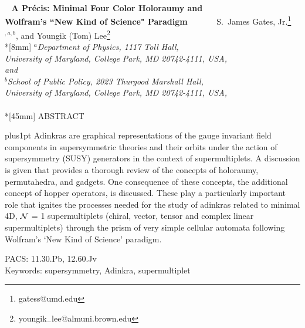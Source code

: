 \documentclass[12pt]{article}
\begin{document}
\thispagestyle{empty}
%
\noindent{\small
\hfill{  \\ %
$~~~~~~~~~~~~~~~~~~~~~~~~~~~~~~~~~~~~~~~~~~~~~~~~~~~~~~~~~~~~~~~~~$
$~~~~~~~~~~~~~~~~~~~~~~~~~~~~~~~~~~~~~~~~~~~~~~~~~~~~~~~~~~~~~~~~~$
{}
}}
\vspace*{0mm}
\begin{center}
{\large \bf
$ ~~$ A  Pr\' ecis: Minimal Four Color 
Holoraumy and  
$~$\\[2pt]
Wolfram's ``New Kind of Science" Paradigm}   \vskip0.3in
{\large {
$~~~~~~~~~~~~~$
S.\ James Gates, Jr.\footnote{gatess@umd.edu}$^{,a,b}$, and 
Youngik (Tom) Lee\footnote{youngik${}_-$lee@almuni.brown.edu}
$~~~~~~$
\newline
}}
\\*[8mm]
\emph{
\centering
$^{a} $Department of Physics, 1117 Toll Hall,
\\[1pt]
University of Maryland, College Park, MD 20742-4111, USA,
\\[4pt] and \\[4pt]
$^{b}$School of Public Policy, 2023
Thurgood Marshall Hall,
\\[1pt]
University of Maryland, College Park, MD 20742-4111, USA,
\\[12pt]
} $~$
 \\*[45mm]
{ ABSTRACT}\\[4mm]
\parbox{142mm}{\parindent=2pc\indent\baselineskip=14pt plus1pt
Adinkras are graphical representations of the gauge invariant field components in supersymmetric theories and their orbits under the action of supersymmetry (SUSY) generators in the
context of supermultiplets. A discussion is given that provides
a thorough review of the concepts of holoraumy, permutahedra,
and gadgets.  One consequence of these concepts, the additional concept of hopper operators, is discussed.  These play a particularly
important role that ignites the processes needed for the study of adinkras related to minimal 4D, $\cal N$ = 1 supermultiplets (chiral, vector, tensor and complex linear supermultiplets) through the prism of very simple cellular automata following Wolfram's `New Kind of Science' paradigm.
}


 \end{center}
\vfill
\noindent PACS: 11.30.Pb, 12.60.Jv\\
Keywords: supersymmetry, Adinkra, supermultiplet 
\vfill
\clearpage
%
\end{document}
